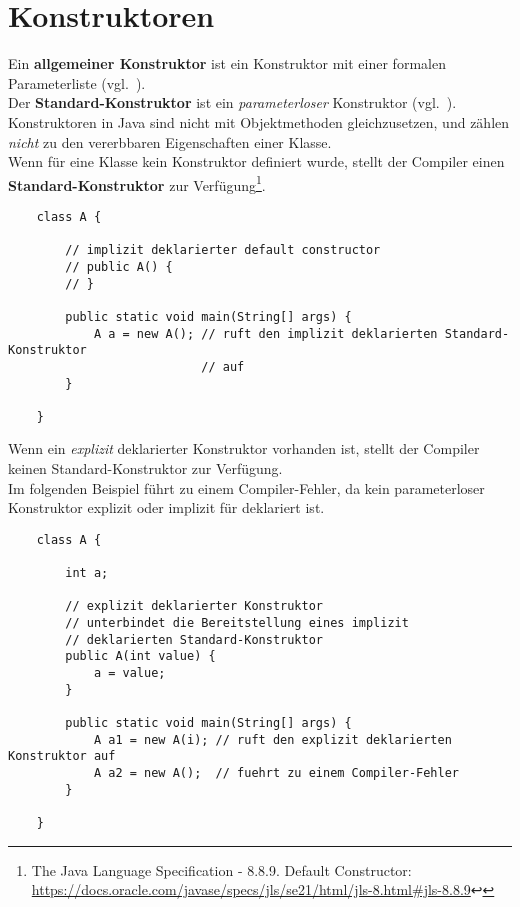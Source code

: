 \section{Konstruktoren}

Ein \textbf{allgemeiner Konstruktor} ist ein Konstruktor mit einer formalen Parameterliste (vgl.~\cite[424]{Ull23}).\\

\noindent
Der \textbf{Standard-Konstruktor} ist ein \textit{parameterloser} Konstruktor (vgl.~\cite[423]{Ull23}). \\

\noindent
Konstruktoren in Java sind nicht mit Objektmethoden gleichzusetzen, und zählen \textit{nicht} zu den vererbbaren Eigenschaften einer Klasse.\\

\noindent
Wenn für eine Klasse kein Konstruktor definiert wurde, stellt der Compiler einen \textbf{Standard-Konstruktor}
zur Verfügung\footnote{
    The Java Language Specification - 8.8.9. Default Constructor: \url{https://docs.oracle.com/javase/specs/jls/se21/html/jls-8.html#jls-8.8.9}↩
}.


\begin{verbatim}
    class A {

        // implizit deklarierter default constructor
        // public A() {
        // }

        public static void main(String[] args) {
            A a = new A(); // ruft den implizit deklarierten Standard-Konstruktor
                           // auf
        }

    }
\end{verbatim}

\noindent
Wenn ein \textit{explizit} deklarierter Konstruktor vorhanden ist, stellt der Compiler keinen Standard-Konstruktor zur Verfügung.\\

\noindent
Im folgenden Beispiel führt  zu einem Compiler-Fehler, da kein parameterloser Konstruktor explizit oder implizit für  deklariert ist.

\begin{verbatim}
    class A {

        int a;

        // explizit deklarierter Konstruktor
        // unterbindet die Bereitstellung eines implizit
        // deklarierten Standard-Konstruktor
        public A(int value) {
            a = value;
        }

        public static void main(String[] args) {
            A a1 = new A(i); // ruft den explizit deklarierten Konstruktor auf
            A a2 = new A();  // fuehrt zu einem Compiler-Fehler
        }

    }
\end{verbatim}


